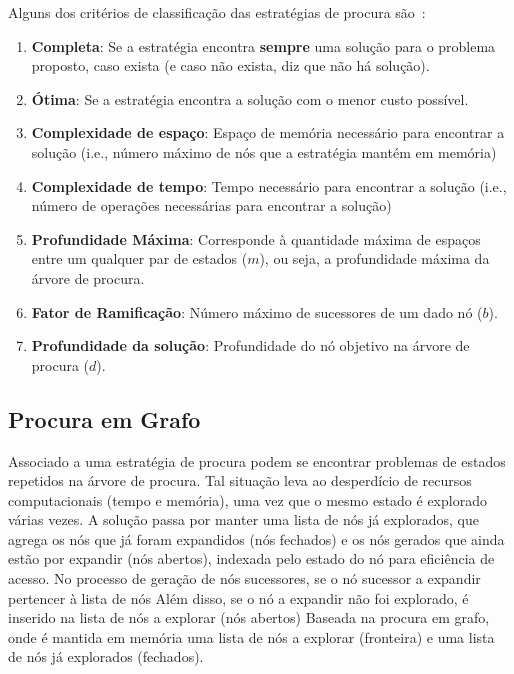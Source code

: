 Alguns dos critérios de classificação das estratégias de procura são~\cite{ist:leic:resumos:procura-cega, isel:iasa:slides:proc-espaco-estados-parte-2}:

\begin{enumerate}
    \item \textbf{Completa}: Se a estratégia encontra \textbf{sempre} uma solução para o problema proposto, caso exista (e caso não exista, diz que não há solução).
    \item \textbf{Ótima}: Se a estratégia encontra a solução com o menor custo possível.
    \item \textbf{Complexidade de espaço}: Espaço de memória necessário para encontrar a solução (i.e., número máximo de nós que a estratégia mantém em memória)
    \item \textbf{Complexidade de tempo}: Tempo necessário para encontrar a solução (i.e., número de operações necessárias para encontrar a solução)
    \item \textbf{Profundidade Máxima}: Corresponde à quantidade máxima de espaços entre um qualquer par de estados ($m$), ou seja, a profundidade máxima da árvore de procura.
    \item \textbf{Fator de Ramificação}: Número máximo de sucessores de um dado nó ($b$).
    \item \textbf{Profundidade da solução}: Profundidade do nó objetivo na árvore de procura ($d$).
\end{enumerate}

\subsection{Procura em Grafo}\label{subsec:procura-grafo}

Associado a uma estratégia de procura podem se encontrar problemas de estados repetidos na árvore de procura.
Tal situação leva ao desperdício de recursos computacionais (tempo e memória), uma vez que o mesmo estado é explorado várias vezes.
A solução passa por manter uma lista de nós já explorados, que agrega os nós que já foram expandidos (nós fechados) e os nós gerados que ainda estão por expandir (nós abertos), indexada pelo estado do nó para eficiência de acesso.
No processo de geração de nós sucessores, se o nó sucessor a expandir pertencer à lista de nós
Além disso, se o nó a expandir não foi explorado, é inserido na lista de nós a explorar (nós abertos)
Baseada na procura em grafo, onde é mantida em memória uma lista de nós a explorar (fronteira) e uma lista de nós já explorados (fechados).

